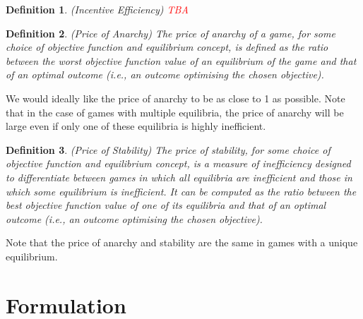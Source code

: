 \documentclass{article}
\newtheorem{definition}{Definition}
\begin{document}
\begin{definition}
(Incentive Efficiency) \textcolor{red}{TBA}
\end{definition}

\begin{definition}
(Price of Anarchy) The price of anarchy of a game, for some choice of objective function and equilibrium concept, is defined as the ratio between the worst objective function value of an equilibrium of the game and that of an optimal outcome (i.e., an outcome optimising the chosen objective).
\end{definition}

We would ideally like the price of anarchy to be as close to 1 as possible. Note that in the case of games with multiple equilibria, the price of anarchy will be large even if only one of these equilibria is highly inefficient. 

\begin{definition}
(Price of Stability) The price of stability, for some choice of objective function and equilibrium concept, is a measure of inefficiency designed to differentiate between games in which all equilibria are inefficient and those in which some equilibrium is inefficient. It can be computed as the ratio between the best objective function value of one of its equilibria and that of an optimal outcome (i.e., an outcome optimising the chosen objective).
\end{definition}

Note that the price of anarchy and stability are the same in games with a unique equilibrium.

\section{Formulation}
\end{document}
